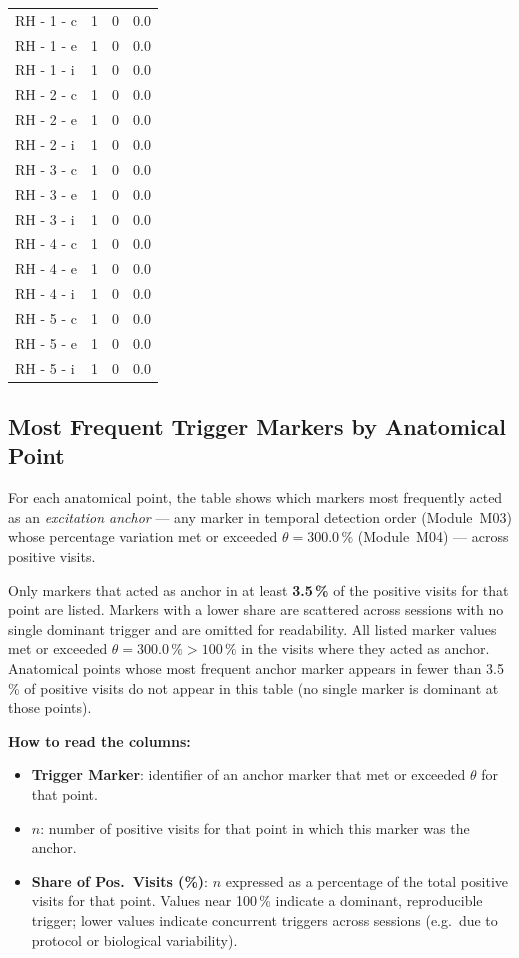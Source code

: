 \documentclass[a4paper,11pt]{article}
\begin{document}
\begin{small}
\begin{longtable}{p{5cm}rrr}
RH - 1 - c & 1 & 0 & 0.0 \\
RH - 1 - e & 1 & 0 & 0.0 \\
RH - 1 - i & 1 & 0 & 0.0 \\
RH - 2 - c & 1 & 0 & 0.0 \\
RH - 2 - e & 1 & 0 & 0.0 \\
RH - 2 - i & 1 & 0 & 0.0 \\
RH - 3 - c & 1 & 0 & 0.0 \\
RH - 3 - e & 1 & 0 & 0.0 \\
RH - 3 - i & 1 & 0 & 0.0 \\
RH - 4 - c & 1 & 0 & 0.0 \\
RH - 4 - e & 1 & 0 & 0.0 \\
RH - 4 - i & 1 & 0 & 0.0 \\
RH - 5 - c & 1 & 0 & 0.0 \\
RH - 5 - e & 1 & 0 & 0.0 \\
RH - 5 - i & 1 & 0 & 0.0 \\
\end{longtable}
\end{small}

\subsection{Most Frequent Trigger Markers by Anatomical Point}

For each anatomical point, the table shows which markers most frequently acted as an
\emph{excitation anchor} --- any marker in temporal detection order (Module~M03)
whose percentage variation met or exceeded $\theta = 300.0\,\%$
(Module~M04) --- across positive visits.

\medskip
Only markers that acted as anchor in at least \textbf{3.5\,\%}
of the positive visits for that point are listed.
Markers with a lower share are scattered across sessions with no single dominant trigger
and are omitted for readability.
All listed marker values met or exceeded $\theta = 300.0\,\% > 100\,\%$ in the
visits where they acted as anchor.
Anatomical points whose most frequent anchor marker appears in fewer than
3.5\,\% of positive visits do not appear in this table (no single
marker is dominant at those points).

\medskip
\noindent\textbf{How to read the columns:}
\begin{itemize}
  \item \textbf{Trigger Marker}: identifier of an anchor marker that met or exceeded $\theta$
        for that point.
  \item \textbf{$n$}: number of positive visits for that point in which this marker was
        the anchor.
  \item \textbf{Share of Pos.\ Visits (\%)}: $n$ expressed as a percentage of the total
        positive visits for that point.
        Values near 100\,\% indicate a dominant, reproducible trigger;
        lower values indicate concurrent triggers across sessions (e.g.\ due to
        protocol or biological variability).
\end{itemize}
\end{document}
